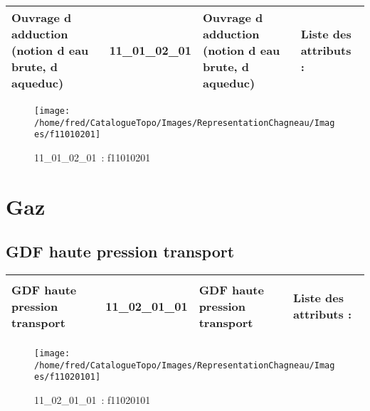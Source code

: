 \documentclass[12pt,titlepage]{book}
\begin{document}
\renewcommand{\arraystretch}{1.2}
\begin{supertabular}{|p{10cm}|c|p{13cm}|p{12cm}|}
 Ouvrage d adduction (notion d eau brute, d aqueduc) & 11\_01\_02\_01 & Ouvrage d adduction (notion d eau brute, d aqueduc) & Liste des attributs :
\begin{enumerate}
\end{enumerate}
\\
\hline
\end{supertabular}
\begin{figure}[h!]
  \hfill         %
  \begin{minipage}[t]{3cm}
    \begin{center}
      \texttt{[image: /home/fred/CatalogueTopo/Images/RepresentationChagneau/Images/f11010201]}
      \caption[~11\_01\_02\_01]{\small{11\_01\_02\_01~:} \tiny{f11010201}}\label{f11010201}
    \end{center}
  \end{minipage}
\end{figure}

\section{\large Gaz}
\subsection{GDF haute pression transport}
\noindent
\vspace{\baselineskip}

\renewcommand{\arraystretch}{1.2}
\begin{supertabular}{|p{10cm}|c|p{13cm}|p{12cm}|}
 GDF haute pression transport & 11\_02\_01\_01 & GDF haute pression transport & Liste des attributs :
\begin{enumerate}
\end{enumerate}
\\
\hline
\end{supertabular}
\begin{figure}[h!]
  \hfill         %
  \begin{minipage}[t]{3cm}
    \begin{center}
      \texttt{[image: /home/fred/CatalogueTopo/Images/RepresentationChagneau/Images/f11020101]}
      \caption[~11\_02\_01\_01]{\small{11\_02\_01\_01~:} \tiny{f11020101}}\label{f11020101}
    \end{center}
  \end{minipage}
\end{figure}
\end{document}
